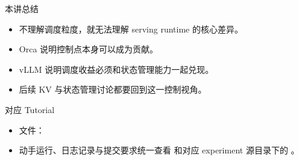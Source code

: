 \begin{frame}{本讲总结}
  \begin{itemize}
    \item 不理解调度粒度，就无法理解 serving runtime 的核心差异。
    \item Orca 说明控制点本身可以成为贡献。
    \item vLLM 说明调度收益必须和状态管理能力一起兑现。
    \item 后续 KV 与状态管理讨论都要回到这一控制视角。
  \end{itemize}
\end{frame}

\begin{frame}{对应 Tutorial}
  \begin{itemize}
    \item 文件：\texttt{}
    \item 动手运行、日志记录与提交要求统一查看 \texttt{} 和对应 experiment 源目录下的 \texttt{}。
  \end{itemize}
\end{frame}

